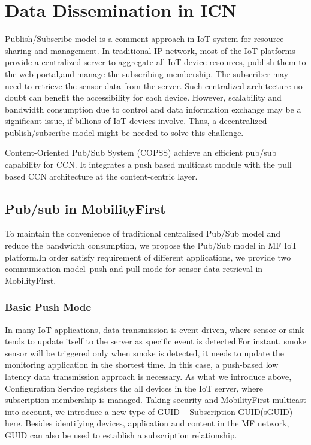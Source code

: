 \section{Data Dissemination in ICN}\label{pubsub}
Publish/Subscribe model is a comment approach in IoT system for resource sharing and management. In traditional IP network, most of the IoT platforms provide a centralized server to aggregate all IoT device resources, publish them to the web portal,and manage the subscribing membership. The subscriber may need to retrieve the sensor data from the server. Such centralized architecture no doubt can benefit the accessibility for each device. However, scalability and bandwidth consumption due to control and data information exchange may be a significant issue, if billions of IoT devices involve. Thus, a decentralized publish/subscribe model might be needed to solve this challenge.

Content-Oriented Pub/Sub System (COPSS)\cite{} achieve an efficient pub/sub capability for CCN. It integrates a push based multicast module with the pull based CCN architecture at the content-centric layer.

\subsection{Pub/sub in MobilityFirst}
To maintain the convenience of traditional centralized Pub/Sub model and reduce the bandwidth consumption, we propose the Pub/Sub model in MF IoT platform.In order satisfy requirement of different applications, we provide two communication model--push and pull mode for sensor data retrieval in MobilityFirst.

\subsubsection{Basic Push Mode}
In many IoT applications, data transmission is event-driven, where sensor or sink tends to update itself to the server as specific event is detected.For instant, smoke sensor will be triggered only when smoke is detected, it needs to update the monitoring application in the shortest time. In this case, a push-based low latency data transmission approach is necessary.    As what we introduce above, Configuration Service registers the all devices in the IoT server, where subscription membership is managed. Taking security and MobilityFirst multicast into account, we introduce a new type of GUID -- Subscription GUID(sGUID) here. Besides identifying devices, application and content in the MF network, GUID can also be used to establish a subscription relationship. 

